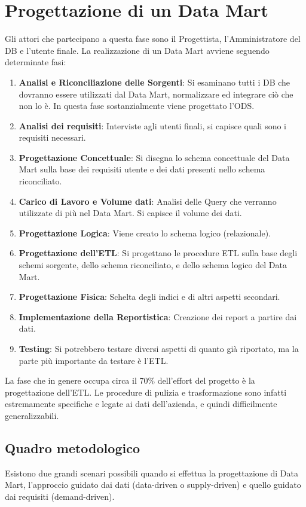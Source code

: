 \section{Progettazione di un Data Mart}
Gli attori che partecipano a questa fase sono il Progettista, l'Amministratore del DB e l'utente finale.
La realizzazione di un Data Mart avviene seguendo determinate fasi:
\begin{enumerate}
	\item \textbf{Analisi e Riconciliazione delle Sorgenti}: Si esaminano tutti i DB che dovranno essere utilizzati dal Data Mart, normalizzare ed integrare ciò che non lo è. In questa fase sostanzialmente viene progettato l'ODS.
	\item \textbf{Analisi dei requisiti}: Interviste agli utenti finali, si capisce quali sono i requisiti necessari.
	\item \textbf{Progettazione Concettuale}: Si disegna lo schema concettuale del Data Mart sulla base dei requisiti utente e dei dati presenti nello schema riconciliato.
	\item \textbf{Carico di Lavoro e Volume dati}: Analisi delle Query che verranno utilizzate di più nel Data Mart. Si capisce il volume dei dati.
	\item \textbf{Progettazione Logica}: Viene creato lo schema logico (relazionale).
	\item \textbf{Progettazione dell'ETL}: Si progettano le procedure ETL sulla base degli schemi sorgente, dello schema riconciliato, e dello schema logico del Data Mart.
	\item \textbf{Progettazione Fisica}: Schelta degli indici e di altri aspetti secondari.
	\item \textbf{Implementazione della Reportistica}: Creazione dei report a partire dai dati.
	\item \textbf{Testing}: Si potrebbero testare diversi aspetti di quanto già riportato, ma la parte più importante da testare è l'ETL.
\end{enumerate}
La fase che in genere occupa circa il 70\% dell'effort del progetto è la progettazione dell'ETL. Le procedure di pulizia e trasformazione sono infatti estremamente specifiche e legate ai dati dell'azienda, e quindi difficilmente generalizzabili.

\subsection{Quadro metodologico}
Esistono due grandi scenari possibili quando si effettua la progettazione di Data Mart, l'approccio guidato dai dati (data-driven o supply-driven) e quello guidato dai requisiti (demand-driven).

